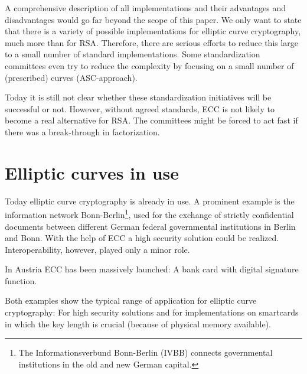 A comprehensive description of all implementations and their advantages and disadvantages would go far beyond the scope of this paper. We only want to state that there is a variety of possible implementations for elliptic curve cryptography, much more than for RSA. Therefore, there are serious efforts to reduce this large to a small number of standard implementations. Some standardization committees even try to reduce the complexity by focusing on a small number of (prescribed) curves (ASC-approach).

Today it is still not clear whether these standardization initiatives will be
successful or not. However, without agreed standards, ECC is not likely to
become a real alternative for RSA. The committees might be forced to act fast
if there was a break-through in factorization.


\section{Elliptic curves in use}

Today elliptic curve cryptography is already in use. A prominent example is the information network Bonn-Berlin\footnote{The Informationsverbund Bonn-Berlin (IVBB) connects governmental institutions in the old and new German capital.}, used for the exchange of strictly confidential documents between different German federal governmental institutions in Berlin and Bonn. With the help of ECC a high security solution could be realized. Interoperability, however, played only a minor role.

In Austria ECC has been massively launched: A bank card with digital signature function.

Both examples show the typical range of application for elliptic curve cryptography: For high security solutions and for implementations on smartcards in which the key length is crucial (because of physical memory available).




